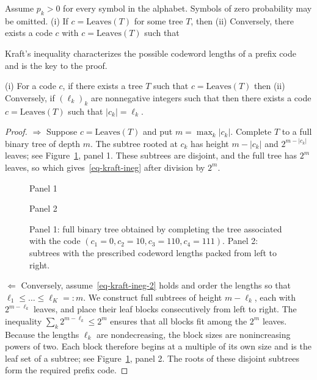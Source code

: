 \begin{thm}\label{thm-shannon-source-coding}
Assume $p_k>0$ for every symbol in the alphabet. Symbols of zero probability may be omitted.
	(i) If $c=\text{Leaves}(T)$ for some tree $T$, then 
	(ii) Conversely, there exists a code $c$ with $c=\text{Leaves}(T)$ such that 
\end{thm} 

Kraft's inequality characterizes the possible codeword lengths of a prefix code and is the key to the proof.

\begin{lem}\label{lem-kraft}
	(i) For a code $c$, if there exists a tree $T$ such that $c=\text{Leaves}(T)$ then
	(ii) Conversely, if $(\ell_k)_k$ are nonnegative integers such that
	then there exists a code $c=\text{Leaves}(T)$ such that $|c_k|=\ell_k$.
\end{lem} 

\begin{proof}
	$\Rightarrow$ Suppose $c=\text{Leaves}(T)$ and put $m=\max_k |c_k|$. Complete $T$ to a full binary tree of depth $m$.
	The subtree rooted at $c_k$ has height $m-|c_k|$ and $2^{m-|c_k|}$ leaves; see Figure~\ref{fig-kraft-trees}, panel 1. These subtrees are disjoint, and the full tree has $2^m$ leaves, so
	which gives~\eqref{eq-kraft-ineg} after division by $2^m$.
	
	\begin{figure}[tbp]
\centering
{\small\sffamily\color{BookMuted}Panel 1\par}\smallskip
{}
\par\medskip
{\small\sffamily\color{BookMuted}Panel 2\par}\smallskip
{}
\caption{Panel 1: full binary tree obtained by completing the tree associated with the code $(c_1=0, c_2=10, c_3=110, c_4=111)$.
	Panel 2: subtrees with the prescribed codeword lengths packed from left to right.}
\label{fig-kraft-trees}
\end{figure}

	
	$\Leftarrow$ Conversely, assume~\eqref{eq-kraft-ineg-2} holds and order the lengths so that $\ell_1 \leq \ldots \leq \ell_K =: m$.
	We construct full subtrees of height $m-\ell_k$, each with $2^{m-\ell_k}$ leaves, and place their leaf blocks consecutively from left to right.
	The inequality $\sum_k 2^{m-\ell_k} \leq 2^m$ ensures that all blocks fit among the $2^m$ leaves.
	Because the lengths $\ell_k$ are nondecreasing, the block sizes are nonincreasing powers of two. Each block therefore begins at a multiple of its own size and is the leaf set of a subtree; see Figure~\ref{fig-kraft-trees}, panel 2. The roots of these disjoint subtrees form the required prefix code.
\end{proof}



